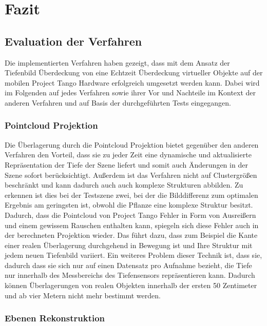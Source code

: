 \chapter{Fazit} \label{sec:conclusion}

\section{Evaluation der Verfahren}

Die implementierten Verfahren haben gezeigt, dass mit dem Ansatz der Tiefenbild Überdeckung von \citet{wloka1995resolving} eine Echtzeit Überdeckung virtueller Objekte auf der mobilen Project Tango Hardware erfolgreich umgesetzt werden kann. Dabei wird im Folgenden auf jedes Verfahren sowie ihrer Vor und Nachteile im Kontext der anderen Verfahren und auf Basis der durchgeführten Tests eingegangen. \\

\subsection*{Pointcloud Projektion}

Die Überlagerung durch die Pointcloud Projektion bietet gegenüber den anderen Verfahren den Vorteil, dass sie zu jeder Zeit eine dynamische und aktualisierte Repräsentation der Tiefe der Szene liefert und somit auch Änderungen in der Szene sofort berücksichtigt. Außerdem ist das Verfahren nicht auf Clustergrößen beschränkt und kann dadurch auch auch komplexe Strukturen abbilden. Zu erkennen ist dies bei der Testszene zwei, bei der die Bilddifferenz zum optimalen Ergebnis am geringsten ist, obwohl die Pflanze eine komplexe Struktur besitzt.\\

Dadurch, dass die Pointcloud von Project Tango Fehler in Form von Ausreißern und einem gewissem Rauschen enthalten kann, spiegeln sich diese Fehler auch in der berechneten Projektion wieder. Das führt dazu, dass zum Beispiel die Kante einer realen Überlagerung durchgehend in Bewegung ist und Ihre Struktur mit jedem neuen Tiefenbild variiert. Ein weiteres Problem dieser Technik ist, dass sie, dadurch dass sie sich nur auf einen Datensatz pro Aufnahme bezieht, die Tiefe nur innerhalb des Messbereichs des Tiefensensors repräsentieren kann. Dadurch können Überlagerungen von realen Objekten innerhalb der ersten 50 Zentimeter und ab vier Metern nicht mehr bestimmt werden.\\

\subsection*{Ebenen Rekonstruktion}

